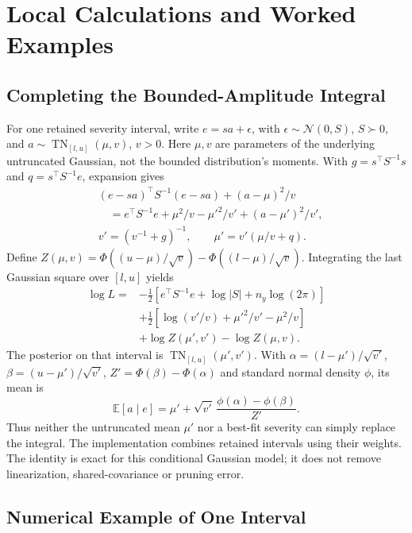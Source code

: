 

\section{Local Calculations and Worked Examples}
\label{app:causal-calculations}

\subsection{Completing the Bounded-Amplitude Integral}
\label{sec:supp-causal-integral}

For one retained severity interval, write
$e=sa+\epsilon$, with $\epsilon\sim\mathcal N(0,S)$,
$S\succ0$, and $a\sim\operatorname{TN}_{[l,u]}(\mu,v)$, $v>0$.
Here $\mu,v$ are parameters of the underlying untruncated Gaussian, not
the bounded distribution's moments. With
$g=s^\top S^{-1}s$ and $q=s^\top S^{-1}e$, expansion gives
\begin{align}
 &(e-sa)^\top S^{-1}(e-sa)+(a-\mu)^2/v\nonumber\\
 &\quad=e^\top S^{-1}e+\mu^2/v-\mu'^2/v'
                  +(a-\mu')^2/v',\\
 &v'=(v^{-1}+g)^{-1},\qquad
 \mu'=v'(\mu/v+q).
\end{align}
Define $Z(\mu,v)=\Phi((u-\mu)/\sqrt v)-\Phi((l-\mu)/\sqrt v)$.
Integrating the last Gaussian square over $[l,u]$ yields
\begin{align}
 \log L={}&-\tfrac12[e^\top S^{-1}e+\log|S|+n_y\log(2\pi)]\nonumber\\
 &+\tfrac12[\log(v'/v)+\mu'^2/v'-\mu^2/v]\nonumber\\
 &+\log Z(\mu',v')-\log Z(\mu,v).
 \label{eq:supp-causal-integral}
\end{align}
The posterior on that interval is
$\operatorname{TN}_{[l,u]}(\mu',v')$. With
$\alpha=(l-\mu')/\sqrt{v'}$, $\beta=(u-\mu')/\sqrt{v'}$,
$Z'=\Phi(\beta)-\Phi(\alpha)$ and standard normal density $\phi$,
its mean is
\begin{equation}
 \mathbb E[a\mid e]=\mu'+\sqrt{v'}\,
       \frac{\phi(\alpha)-\phi(\beta)}{Z'}.
\end{equation}
Thus neither the untruncated mean $\mu'$ nor a best-fit severity can simply
replace the integral. The implementation combines retained intervals using
their weights. The identity is exact for this conditional Gaussian model;
it does not remove linearization, shared-covariance or pruning error.

\subsection{Numerical Example of One Interval}

